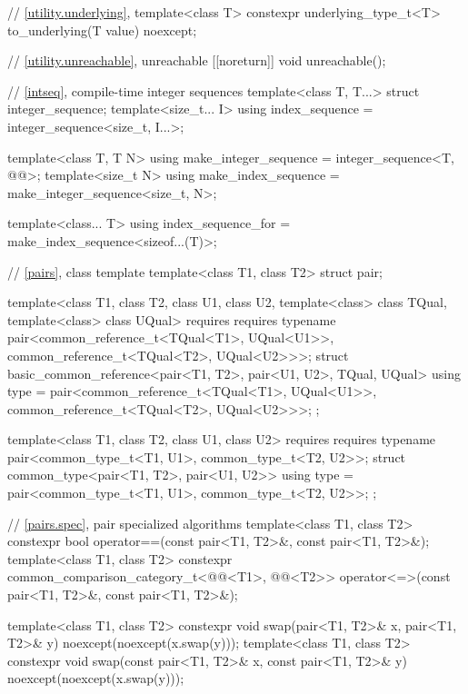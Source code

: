 \begin{codeblock}
{  // \ref{utility.underlying}, 
  template<class T>
    constexpr underlying_type_t<T> to_underlying(T value) noexcept;

  // \ref{utility.unreachable}, unreachable
  [[noreturn]] void unreachable();

  // \ref{intseq}, compile-time integer sequences%
%
%
  template<class T, T...>
    struct integer_sequence;
  template<size_t... I>
    using index_sequence = integer_sequence<size_t, I...>;

  template<class T, T N>
    using make_integer_sequence = integer_sequence<T, @\seebelow{}@>;
  template<size_t N>
    using make_index_sequence = make_integer_sequence<size_t, N>;

  template<class... T>
    using index_sequence_for = make_index_sequence<sizeof...(T)>;

  // \ref{pairs}, class template 
  template<class T1, class T2>
    struct pair;

  template<class T1, class T2, class U1, class U2,
           template<class> class TQual, template<class> class UQual>
    requires requires { typename pair<common_reference_t<TQual<T1>, UQual<U1>>,
                                      common_reference_t<TQual<T2>, UQual<U2>>>; }
  struct basic_common_reference<pair<T1, T2>, pair<U1, U2>, TQual, UQual> {
    using type = pair<common_reference_t<TQual<T1>, UQual<U1>>,
                      common_reference_t<TQual<T2>, UQual<U2>>>;
  };

  template<class T1, class T2, class U1, class U2>
    requires requires { typename pair<common_type_t<T1, U1>, common_type_t<T2, U2>>; }
  struct common_type<pair<T1, T2>, pair<U1, U2>> {
    using type = pair<common_type_t<T1, U1>, common_type_t<T2, U2>>;
  };

  // \ref{pairs.spec}, pair specialized algorithms
  template<class T1, class T2>
    constexpr bool operator==(const pair<T1, T2>&, const pair<T1, T2>&);
  template<class T1, class T2>
    constexpr common_comparison_category_t<@@<T1>,
                                           @@<T2>>
      operator<=>(const pair<T1, T2>&, const pair<T1, T2>&);

  template<class T1, class T2>
    constexpr void swap(pair<T1, T2>& x, pair<T1, T2>& y) noexcept(noexcept(x.swap(y)));
  template<class T1, class T2>
    constexpr void swap(const pair<T1, T2>& x, const pair<T1, T2>& y)
      noexcept(noexcept(x.swap(y)));

}
\end{codeblock}
